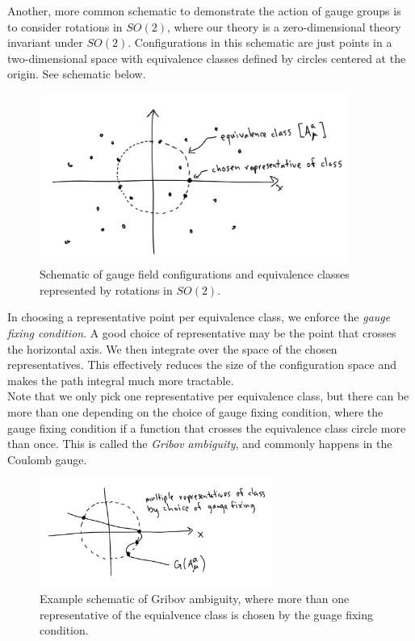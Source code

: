 \noindent Another, more common schematic to demonstrate the action of gauge groups is to consider rotations in $SO(2)$, where our theory is a zero-dimensional theory invariant under $SO(2)$. Configurations in this schematic are just points in a two-dimensional space with equivalence classes defined by circles centered at the origin. See schematic below. \\

\begin{figure}[H]
	\centering
	\includegraphics[width=4in]{images/so2schematic.png}
	\caption*{Schematic of gauge field configurations and equivalence classes represented by rotations in $SO(2)$.}
\end{figure}

\noindent In choosing a representative point per equivalence class, we enforce the \textit{gauge fixing condition}. A good choice of representative may be the point that crosses the horizontal axis. We then integrate over the space of the chosen representatives. This effectively reduces the size of the configuration space and makes the path integral much more tractable. \\

\noindent Note that we only pick one representative per equivalence class, but there can be more than one depending on the choice of gauge fixing condition, where the gauge fixing condition if a function that crosses the equivalence class circle more than once. This is called the \textit{Gribov ambiguity}, and commonly happens in the Coulomb gauge. \\

\begin{figure}[H]
	\centering
	\includegraphics[width=3in]{images/gribov.png}
	\caption*{Example schematic of Gribov ambiguity, where more than one representative of the equialvence class is chosen by the guage fixing condition.}
\end{figure}

